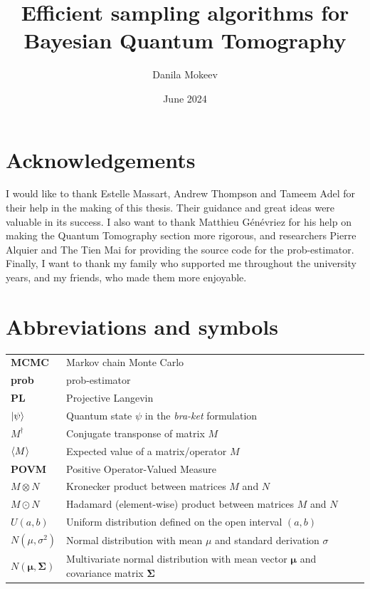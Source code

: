 \documentclass[12pt]{memoir}
\title{Efficient sampling algorithms for Bayesian Quantum Tomography}
\author{Danila Mokeev}
\date{June 2024}
\newcommand{\tb}{\textbf}
\newcommand{\ti}{\textit}
\begin{document}


\chapter*{Acknowledgements}
I would like to thank Estelle Massart, Andrew Thompson and Tameem Adel for their help in the making of this thesis. Their guidance and great ideas were valuable in its success. I also want to thank Matthieu Génévriez for his help on making the Quantum Tomography section more rigorous, and researchers Pierre Alquier and The Tien Mai for providing the source code for the prob-estimator. Finally, I want to thank my family who supported me throughout the university years, and my friends, who made them more enjoyable.
\newpage

\tableofcontents*

\newpage

\chapter*{Abbreviations and symbols}
\begin{tabular}{ll}
\tb{MCMC} & Markov chain Monte Carlo\\
\tb{prob} & prob-estimator\\
\tb{PL}& Projective Langevin  \\
$\ket{{\psi}}$ & Quantum state $\psi$ in the \ti{bra-ket} formulation\\
${M^\dagger}$ & Conjugate transponse of matrix $M$\\
$\braket{M}$ & Expected value of a matrix/operator $M$\\
\tb {POVM} & Positive Operator-Valued Measure\\
${M\otimes N}$ & Kronecker product between matrices $M$ and $N$\\
${M \odot N}$ & Hadamard (element-wise) product between matrices $M$ and $N$\\
${U}(a,b)$ & Uniform distribution defined on the open interval $(a,b)$\\
$N(\mu, \sigma^2)$ & Normal distribution with mean $\mu$ and standard derivation $\sigma$\\
$N(\boldsymbol{\mu},\boldsymbol{\Sigma})$ & Multivariate normal distribution with mean vector $\boldsymbol{\mu}$ and covariance matrix $\boldsymbol{\Sigma}$ 
\end{tabular}
\end{document}
